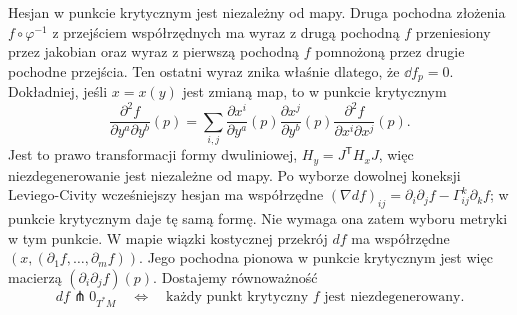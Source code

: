 Hesjan w punkcie krytycznym jest niezależny
od mapy. Druga pochodna złożenia
$f\circ\varphi^{-1}$ z przejściem współrzędnych
ma wyraz z drugą pochodną $f$ przeniesiony
przez jakobian oraz wyraz z pierwszą pochodną
$f$ pomnożoną przez drugie pochodne przejścia.
Ten ostatni wyraz znika właśnie dlatego,
że $\dd f_p=0$. Dokładniej, jeśli $x=x(y)$ jest zmianą map,
to w punkcie krytycznym
\[
 \frac{\partial^2 f}{\partial y^a\partial y^b}(p)
 =\sum_{i,j}\frac{\partial x^i}{\partial y^a}(p)
             \frac{\partial x^j}{\partial y^b}(p)
             \frac{\partial^2 f}{\partial x^i\partial x^j}(p).
\]
Jest to prawo transformacji formy dwuliniowej,
$H_y=J^{\mathsf T}H_xJ$, więc niezdegenerowanie jest
niezależne od mapy. Po wyborze dowolnej koneksji
Leviego-Civity wcześniejszy hesjan ma współrzędne
$(\nabla df)_{ij}=\partial_i\partial_jf-\Gamma^k_{ij}\partial_kf$;
w punkcie krytycznym daje tę samą formę. Nie wymaga
ona zatem wyboru metryki w tym punkcie.
W mapie wiązki kostycznej
przekrój $df$ ma współrzędne
$(x,(\partial_1f,\ldots,\partial_m f))$.
Jego pochodna pionowa w punkcie krytycznym
jest więc macierzą
$(\partial_i\partial_j f)(p)$. Dostajemy
równoważność
\begin{equation}\label{eq:morse-transwersalnosc}
 df\pitchfork 0_{T^*M}
 \quad\Longleftrightarrow\quad
 \text{każdy punkt krytyczny $f$ jest
 niezdegenerowany.}
\end{equation}

